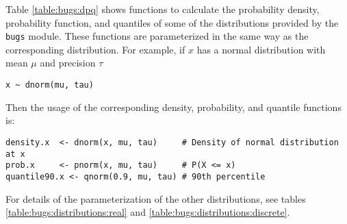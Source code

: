 \documentclass[11pt, a4paper, titlepage]{report}
\begin{document}
Table \ref{table:bugs:dpq} shows functions to calculate the
probability density, probability function, and quantiles of some of
the distributions provided by the \texttt{bugs} module. These
functions are parameterized in the same way as the corresponding
distribution.  For example, if $x$ has a normal distribution with mean
$\mu$ and precision $\tau$
\begin{verbatim}
x ~ dnorm(mu, tau)
\end{verbatim}
Then the usage of the corresponding density, probability, and quantile
functions is: 
\begin{verbatim}
density.x  <- dnorm(x, mu, tau)     # Density of normal distribution at x
prob.x     <- pnorm(x, mu, tau)     # P(X <= x)
quantile90.x <- qnorm(0.9, mu, tau) # 90th percentile
\end{verbatim}
For details of the parameterization of the other distributions, see
tables \ref{table:bugs:distributions:real} and
\ref{table:bugs:distributions:discrete}.
\end{document}
